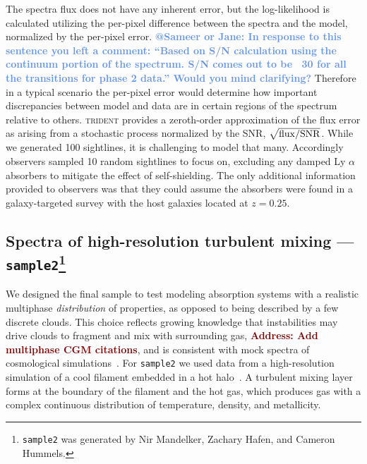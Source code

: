\documentclass[fleqn,usenatbib]{mnras}
\makeatletter
\newcommand{\todo}[1]{\textcolor{Maroon}{\textbf{Address: #1}}}
\newcommand{\atsameer}[1]{\textcolor{CornflowerBlue}{\textbf{@Sameer or Jane: #1}}}
\makeatother
\begin{document}
The spectra flux does not have any inherent error, but the log-likelihood is calculated utilizing the per-pixel difference between the spectra and the model, normalized by the per-pixel error.
\atsameer{In response to this sentence you left a comment: ``Based on S/N calculation using the continuum portion of the spectrum. S/N comes out to be ~30 for all the transitions for phase 2 data.'' Would you mind clarifying?}
Therefore in a typical scenario the per-pixel error would determine how important discrepancies between model and data are in certain regions of the spectrum relative to others.
\textsc{trident} provides a zeroth-order approximation of the flux error as arising from a stochastic process normalized by the SNR, $\sqrt{{\rm flux}/{\rm SNR}}$.
While we generated 100 sightlines, it is challenging to model that many.
Accordingly observers sampled 10 random sightlines to focus on, excluding any damped Ly $\alpha$ absorbers to mitigate the effect of self-shielding.
The only additional information provided to observers was that they could assume the absorbers were found in a galaxy-targeted survey with the host galaxies located at $z=0.25$.

\subsection[Spectra of high-resolution turbulent mixing --- \texttt{sample2}]{Spectra of high-resolution turbulent mixing --- \texttt{sample2}\footnote{
\texttt{sample2} was generated by Nir Mandelker, Zachary Hafen, and Cameron Hummels.}}
\label{s: data generation -- sample2}

We designed the final sample to test modeling absorption systems with a realistic multiphase \textit{distribution} of properties, as opposed to being described by a few discrete clouds.
This choice reflects growing knowledge that instabilities may drive clouds to fragment and mix with surrounding gas, \todo{Add multiphase CGM citations}, and is consistent with mock spectra of cosmological simulations~\citep[e.g.][]{Marra2022}.
For \texttt{sample2} we used data from a high-resolution simulation of a cool filament embedded in a hot halo~\citep{Mandelker2020a}.
A turbulent mixing layer forms at the boundary of the filament and the hot gas, which produces gas with a complex continuous distribution of temperature, density, and metallicity.
\end{document}
